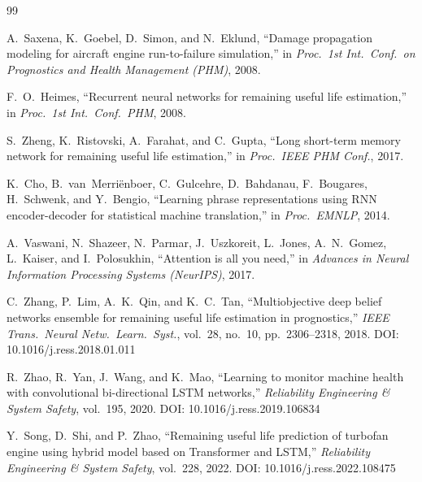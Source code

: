 \documentclass[12pt,a4paper]{report}
\begin{document}
\begin{thebibliography}{99}

A.~Saxena, K.~Goebel, D.~Simon, and N.~Eklund,
\newblock ``Damage propagation modeling for aircraft engine run-to-failure simulation,''
\newblock in \textit{Proc.\ 1st Int.\ Conf.\ on Prognostics and Health Management (PHM)}, 2008.

F.~O.~Heimes,
\newblock ``Recurrent neural networks for remaining useful life estimation,''
\newblock in \textit{Proc.\ 1st Int.\ Conf.\ PHM}, 2008.

S.~Zheng, K.~Ristovski, A.~Farahat, and C.~Gupta,
\newblock ``Long short-term memory network for remaining useful life estimation,''
\newblock in \textit{Proc.\ IEEE PHM Conf.}, 2017.

K.~Cho, B.~van~Merri\"{e}nboer, C.~Gulcehre, D.~Bahdanau, F.~Bougares, H.~Schwenk, and Y.~Bengio,
\newblock ``Learning phrase representations using RNN encoder-decoder for statistical machine translation,''
\newblock in \textit{Proc.\ EMNLP}, 2014.

A.~Vaswani, N.~Shazeer, N.~Parmar, J.~Uszkoreit, L.~Jones, A.~N.~Gomez, L.~Kaiser, and I.~Polosukhin,
\newblock ``Attention is all you need,''
\newblock in \textit{Advances in Neural Information Processing Systems (NeurIPS)}, 2017.

C.~Zhang, P.~Lim, A.~K.~Qin, and K.~C.~Tan,
\newblock ``Multiobjective deep belief networks ensemble for remaining useful life estimation in prognostics,''
\newblock \textit{IEEE Trans.\ Neural Netw.\ Learn.\ Syst.}, vol.~28, no.~10, pp.~2306--2318, 2018.
\newblock DOI: 10.1016/j.ress.2018.01.011

R.~Zhao, R.~Yan, J.~Wang, and K.~Mao,
\newblock ``Learning to monitor machine health with convolutional bi-directional LSTM networks,''
\newblock \textit{Reliability Engineering \& System Safety}, vol.~195, 2020.
\newblock DOI: 10.1016/j.ress.2019.106834

Y.~Song, D.~Shi, and P.~Zhao,
\newblock ``Remaining useful life prediction of turbofan engine using hybrid model based on Transformer and LSTM,''
\newblock \textit{Reliability Engineering \& System Safety}, vol.~228, 2022.
\newblock DOI: 10.1016/j.ress.2022.108475


\end{thebibliography}
\end{document}

